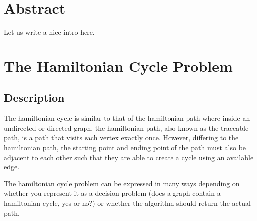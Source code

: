 \section{Abstract}

Let us write a nice intro here.

\section{The Hamiltonian Cycle Problem}

\subsection{Description}

The hamiltonian cycle is similar to that of the hamiltonian path where inside an
undirected or directed graph, the hamiltonian path, also known as the traceable
path, is a path that visits each vertex exactly once. However, differing to the
hamiltonian path, the starting point and ending point of the path must also be
adjacent to each other such that they are able to create a cycle using an
available edge. 

The hamiltonian cycle problem can be expressed in many ways depending on whether
you represent it as a decision problem (does a graph contain a hamiltonian
cycle, yes or no?) or whether the algorithm should return the actual path.


